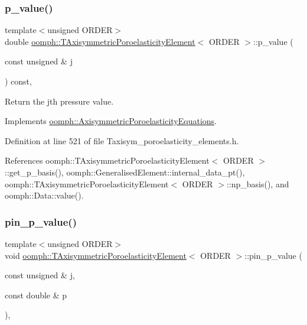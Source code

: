 \subsubsection{\texorpdfstring{p\+\_\+value()}{p\_value()}}
{\footnotesize\ttfamily template$<$unsigned O\+R\+D\+ER$>$ \\
double \hyperlink{classoomph_1_1TAxisymmetricPoroelasticityElement}{oomph\+::\+T\+Axisymmetric\+Poroelasticity\+Element}$<$ O\+R\+D\+ER $>$\+::p\+\_\+value (\begin{DoxyParamCaption}\item[{const unsigned \&}]{j }\end{DoxyParamCaption}) const\hspace{0.3cm}{\ttfamily [inline]}, {\ttfamily [virtual]}}



Return the jth pressure value. 



Implements \hyperlink{classoomph_1_1AxisymmetricPoroelasticityEquations_aab0aa10f1a243bff20e540a3744c1c5b}{oomph\+::\+Axisymmetric\+Poroelasticity\+Equations}.



Definition at line 521 of file Taxisym\+\_\+poroelasticity\+\_\+elements.\+h.



References oomph\+::\+T\+Axisymmetric\+Poroelasticity\+Element$<$ O\+R\+D\+E\+R $>$\+::get\+\_\+p\+\_\+basis(), oomph\+::\+Generalised\+Element\+::internal\+\_\+data\+\_\+pt(), oomph\+::\+T\+Axisymmetric\+Poroelasticity\+Element$<$ O\+R\+D\+E\+R $>$\+::np\+\_\+basis(), and oomph\+::\+Data\+::value().

\mbox{\label{classoomph_1_1TAxisymmetricPoroelasticityElement_a8b8bc5b1b5234116a5129f0f9ef4d463}} 
\subsubsection{\texorpdfstring{pin\+\_\+p\+\_\+value()}{pin\_p\_value()}}
{\footnotesize\ttfamily template$<$unsigned O\+R\+D\+ER$>$ \\
void \hyperlink{classoomph_1_1TAxisymmetricPoroelasticityElement}{oomph\+::\+T\+Axisymmetric\+Poroelasticity\+Element}$<$ O\+R\+D\+ER $>$\+::pin\+\_\+p\+\_\+value (\begin{DoxyParamCaption}\item[{const unsigned \&}]{j,  }\item[{const double \&}]{p }\end{DoxyParamCaption})\hspace{0.3cm}{\ttfamily [inline]}, {\ttfamily [virtual]}}



